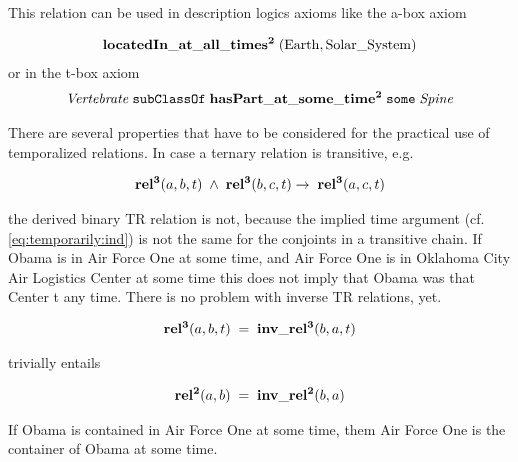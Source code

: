 This relation can be used in description logics axioms like the a-box axiom

\begin{equation}
\begin{split}
\mathrm{\mathbf{locatedIn\_at\_all\_times^2}} \;(\mathrm{Earth}, \mathrm{Solar\_System})  
\end{split}
\label{eq:earth}
\end{equation}
%
or in the t-box axiom
%
\begin{equation}
\begin{split}
\mathit{Vertebrate}\;\mathtt{subClassOf}\;\mathrm{\mathbf{hasPart\_at\_some\_time^2}}\;\mathtt{some}\;\mathit{Spine}
\end{split}
\label{eq:Spine}
\end{equation}    

There are several properties that have to be considered for the practical use of temporalized relations. In case a ternary relation is transitive, e.g.  

\begin{equation}
\begin{split}
\mathrm{\mathbf{rel^3}}(a,b,t) \; \wedge \; \mathrm{\mathbf{rel^3}}(b,c,t) \rightarrow \; \mathrm{\mathbf{rel^3}}(a,c,t)   
\end{split}
\label{eq:trtrans}
\end{equation}    

the derived binary TR relation is not, because the implied time argument (cf. \ref{eq:temporarily:ind}) is not the same for the conjoints in a transitive chain. If Obama is in Air Force One at some time, and Air Force One is in Oklahoma City Air Logistics Center at some time this does not imply that Obama was that Center t any time.
There is no problem with inverse TR relations, yet.   
 
\begin{equation}
\begin{split}
\mathrm{\mathbf{rel^3}}(a,b,t) \; = \; \mathrm{\mathbf{inv\_rel^3}}(b,a,t)  
\end{split}
\label{eq:trinv}
\end{equation}    

trivially entails

\begin{equation}
\begin{split}
\mathrm{\mathbf{rel^2}}(a,b) \; = \; \mathrm{\mathbf{inv\_rel^2}}(b,a)  
\end{split}
\label{eq:trinv2}
\end{equation}    

If Obama is contained in Air Force One at some time, them Air Force One is the container of Obama at some time.

